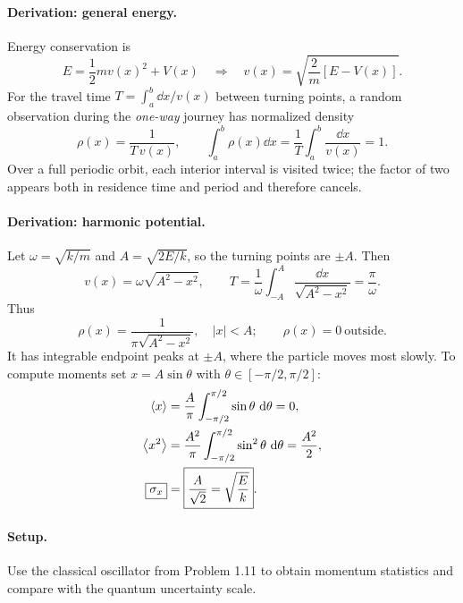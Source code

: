 \paragraph{Derivation: general energy.}
Energy conservation is
\begin{equation}
E=\frac12mv(x)^2+V(x)\quad\Rightarrow\quad
\boxed{v(x)=\sqrt{\frac2m[E-V(x)]}}.
\end{equation}
For the travel time $T=\int_a^b \dd x/v(x)$ between turning points, a random observation during the \emph{one-way} journey has normalized density
\begin{equation}
\rho(x)=\frac1{T\,v(x)},\qquad
\int_a^b\rho(x)\dd x=\frac1T\int_a^b\frac{\dd x}{v(x)}=1.
\end{equation}
Over a full periodic orbit, each interior interval is visited twice; the factor of two appears both in residence time and period and therefore cancels.
\paragraph{Derivation: harmonic potential.}
Let $\omega=\sqrt{k/m}$ and $A=\sqrt{2E/k}$, so the turning points are $\pm A$. Then
\begin{equation}
v(x)=\omega\sqrt{A^2-x^2},\qquad
T=\frac1\omega\int_{-A}^A\frac{\dd x}{\sqrt{A^2-x^2}}
=\frac{\pi}{\omega}.
\end{equation}
Thus
\begin{equation}
\boxed{\rho(x)=\frac1{\pi\sqrt{A^2-x^2}},\quad |x|<A;\qquad
\rho(x)=0\ \text{outside}.}
\end{equation}
It has integrable endpoint peaks at $\pm A$, where the particle moves most slowly. To compute moments set $x=A\sin\theta$ with $\theta\in[-\pi/2,\pi/2]$:
\begin{align}
\left\langle x\right\rangle&=\frac A\pi\int_{-\pi/2}^{\pi/2}\sin\theta\,\,\mathrm{d}\theta=0,\\
\left\langle x^2\right\rangle&=\frac{A^2}{\pi}\int_{-\pi/2}^{\pi/2}\sin^2\theta\,\,\mathrm{d}\theta
=\frac{A^2}{2},\\
\boxed{\sigma_x}&=\boxed{\frac A{\sqrt2}=\sqrt{\frac E{k}}}.
\end{align}

\paragraph{Setup.} Use the classical oscillator from Problem 1.11 to obtain momentum statistics and compare with the quantum uncertainty scale.
